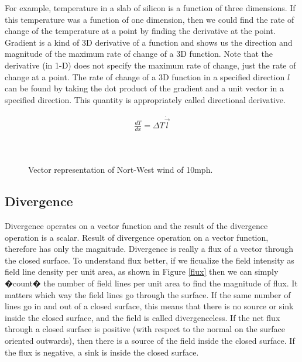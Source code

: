 For example, temperature in a slab of silicon is a function of three dimensions. If this temperature was a function of one dimension, then we could find the rate of change of the temperature at a point by finding the derivative at the point. Gradient is a kind of 3D derivative of a function and shows us the direction and magnitude of the  maximum rate of change of a 3D function. Note that the derivative (in 1-D) does not specify the maximum rate of change, just the rate of change at a point.  The rate of change of a 3D function in  a specified direction $l$ can be found by taking the dot product of the gradient and a unit vector in a specified direction. This quantity is appropriately called directional derivative.


\begin{eqnarray}
\frac{ dT}{dx} = \Delta T \dot \vec{l} \\ \nonumber
\end{eqnarray}








\begin{figure}[htbp]
\begin{center}
\strut{} \\
\end{center}
\caption{Vector representation of Nort-West wind of 10mph.}
\label{wind}
\end{figure}



\subsection{Divergence}

Divergence operates on a vector function and the result of the divergence operation is a scalar. Result of divergence operation on  a vector function, therefore has only the magnitude. Divergence is really a flux of a vector through the closed surface. To understand flux better,  if we ficualize the field intensity as field line density per unit area, as shown in Figure \ref{flux} then we can simply �count� the number of field lines per unit area to find the magnitude  of flux. It matters which way the field lines go through the surface. If the  same number of lines go in and out of a closed surface, this means that there is no source or sink inside the closed surface, and the field is called divergenceless. If the net flux through a closed surface is positive (with respect to the normal on the surface oriented outwards), then there is a source of the field inside the closed surface. If the flux is negative, a sink is inside the closed surface.


